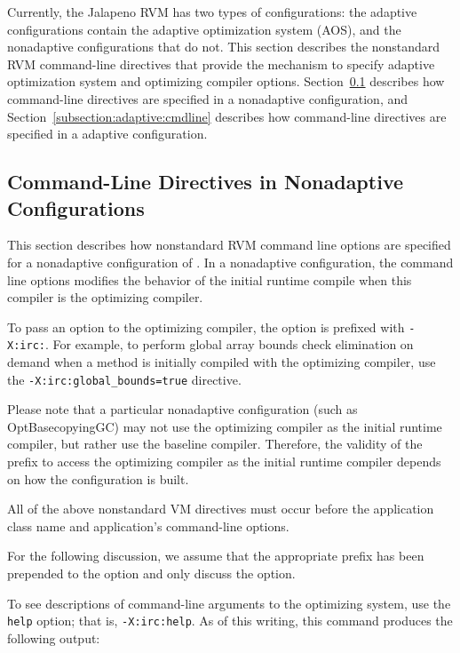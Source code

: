 
Currently, the Jalapeno RVM has two types of configurations:
the adaptive configurations contain the adaptive optimization system (AOS),
and the nonadaptive configurations that do not.  
This section describes the nonstandard RVM command-line directives that 
provide the mechanism to specify adaptive optimization system and optimizing
compiler options.
Section~\ref{subsection:nonadaptive:cmdline} describes how command-line 
directives are specified in a nonadaptive configuration, and 
Section~\ref{subsection:adaptive:cmdline} describes how command-line 
directives are specified in a adaptive configuration.

\subsection{Command-Line Directives in Nonadaptive Configurations}
\label{subsection:nonadaptive:cmdline}

This section describes how nonstandard RVM command line options are 
specified for a nonadaptive configuration of \jp.
In a nonadaptive configuration, the command line options modifies
the behavior of the initial runtime compile when this compiler
is the optimizing compiler.

To pass an option to the optimizing compiler, the option is prefixed
with {\tt -X:irc:}.
For example, to perform global array bounds check elimination on demand
when a method is initially compiled with the optimizing compiler,
use the {\tt -X:irc:global\_bounds=true} directive.

Please note that a particular nonadaptive configuration (such as
OptBasecopyingGC) may not use the 
optimizing compiler as the initial runtime compiler, but rather use the 
baseline compiler.
Therefore, the validity of the prefix to access the optimizing compiler
as the initial runtime compiler depends on how the configuration is built.

All of the above nonstandard VM directives must occur before 
the application class name and application's command-line options.

For the following discussion, we assume that the appropriate prefix has been
prepended to the option and only discuss the option.

To see descriptions of command-line arguments to the optimizing system, use
the {\tt help} option; that is, {\tt -X:irc:help}.  
As of this writing, this command produces the following output:



